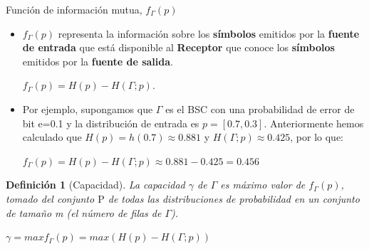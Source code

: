 \documentclass{beamer}
\theoremstyle{plain}
\newtheorem{definicion} [Definicion]{Definición}
\theoremstyle{example}
\theoremstyle{example}
\begin{document}
\begin{frame} {Función de información mutua, $f_{\Gamma}(p)$} \small  
\begin{itemize}  




\item $f_{\Gamma}(p)$ representa la información sobre los \textbf{símbolos} emitidos por la \textbf{fuente de entrada} que está disponible al \textbf{Receptor} que conoce los \textbf{símbolos} emitidos por la \textbf{fuente de salida}. 

\begin{center}
$f_{\Gamma}(p) = H(p)-H(\Gamma ;p).$
\end{center}

\item Por ejemplo, supongamos que $\Gamma$ es el BSC con una probabilidad de error de bit e=0.1 y la distribución de entrada es $p = [0.7,0.3]$. Anteriormente hemos calculado que $H(p) = h(0.7) \approx 0.881$ y $H(\Gamma;p) \approx 0.425$, por lo que:

\begin{center}
$f_{\Gamma}(p) = H(p)-H(\Gamma ;p) \approx 0.881 - 0.425 = 0.456$
\end{center}

\end{itemize} 

\begin{definicion}[Capacidad]

La capacidad $\gamma$ de $\Gamma$ es máximo valor de $f_{\Gamma}(p)$, tomado del conjunto $\mathrm{P}$ de todas las distribuciones de probabilidad en un conjunto de tamaño m (el número de filas de $\Gamma$).

\begin{center}
$\gamma = 	max f_{\Gamma}(p) = max ( H(p)-H(\Gamma ;p))$
\end{center}

\end{definicion}

\end{frame} 



\end{document}
